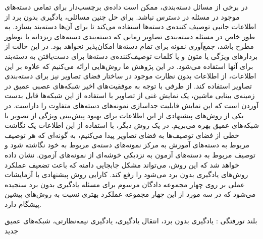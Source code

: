 


\pagestyle{empty}

در برخی از مسائل دسته‌بندی، ممکن است داده‌ی برچسب‌دار برای تمامی دسته‌های موجود در مسئله در دسترس نباشد. برای حل چنین مسائلی، یادگیری بدون برد از اطلاعات جانبی توصیف کننده‌ی دسته‌ها استفاده می‌کند تا برای آن‌ها دسته‌بند بسازد. به طور خاص در مسئله دسته‌بندی تصاویر زمانی که دسته‌بندی دسته‌های ریزدانه یا نوظور مطرح باشد، جمع‌آوری نمونه برای تمام دسته‌ها امکان‌پذیر نخواهد بود. در این حالت از بردارهای ویژگی یا متون و یا کلمات توصیف‌کننده‌ی دسته‌ها برای دست‌یافتن به دسته‌بند برای آنها استفاده می‌شود. در این پژوهش ما روش‌هایی ارائه می‌کنیم که علاوه بر این اطلاعات، از اطلاعات بدون نظارت موجود در ساختار فضای تصاویر نیز برای دسته‌بندی تصاویر استفاده کند. از طرفی با توجه به موفقیت‌های اخیر شبکه‌های عصبی عمیق در زمینه‌ی بینایی ماشین، یک نمایش غنی از تصاویر با استفاده از این شبکه‌ها قابل بدست آوردن است که این نمایش قابلیت جداسازی نمونه‌های دسته‌های متفاوت را داراست.  در یکی از روش‌های پیشنهادی از این اطلاعات برای بهبود پیش‌بینی ویژگی‌ از تصویر با شبکه‌های عمیق بهره می‌بریم. در یک روش دیگر، با استفاده از این اطلاعات یک نگاشت خطی از فضای توصیف‌ها به فضای تصاویر پیدا می‌کنیم، به گونه‌ای که هر توصیف مربوط به دسته‌های آموزش به مرکز نمونه‌های دسته‌ی مربوط به خود نگاشته شود و توصیف مربوط به دسته‌های آزمون به نزدیکی خوشه‌ای از نمونه‌های آزمون. نشان داده خواهد شد که این روش،
می‌تواند مشکل جابجایی دامنه که باعث تضعیف عملکرد روش‌های یادگیری بدون برد می‌شود را رفع کند. کارایی روش پیشنهادی با آزمایشات عملی بر روی چهار مجموعه دادگان مرسوم برای مسئله یادگیری بدون برد سنجیده می‌شود که در سه مورد از این چهار مجموعه عملکرد بهتری نسبت به روش‌های پیشین پیشگام دارد.


‌بلند
‌تورفتگی : 
یادگیری بدون برد، انتقال یادگیری، یادگیری نیمه‌نظارتی، شبکه‌های عمیق
‌جدید
